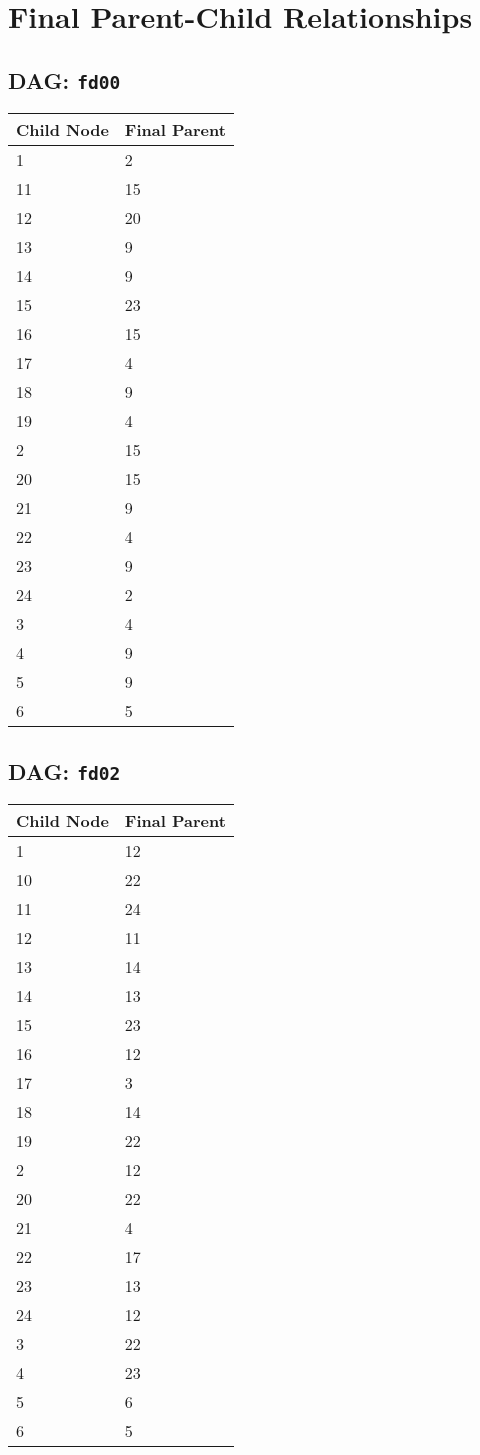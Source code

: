 \documentclass{article}
\begin{document}
\pagestyle{fancy}
\fancyhf{}
\section*{Final Parent-Child Relationships}
\subsection*{DAG: \texttt{fd00}}
\begin{tabular}{ll}
\toprule
\textbf{Child Node} & \textbf{Final Parent} \\
\midrule
1 & 2 \\
11 & 15 \\
12 & 20 \\
13 & 9 \\
14 & 9 \\
15 & 23 \\
16 & 15 \\
17 & 4 \\
18 & 9 \\
19 & 4 \\
2 & 15 \\
20 & 15 \\
21 & 9 \\
22 & 4 \\
23 & 9 \\
24 & 2 \\
3 & 4 \\
4 & 9 \\
5 & 9 \\
6 & 5 \\
\bottomrule
\end{tabular}

\subsection*{DAG: \texttt{fd02}}
\begin{tabular}{ll}
\toprule
\textbf{Child Node} & \textbf{Final Parent} \\
\midrule
1 & 12 \\
10 & 22 \\
11 & 24 \\
12 & 11 \\
13 & 14 \\
14 & 13 \\
15 & 23 \\
16 & 12 \\
17 & 3 \\
18 & 14 \\
19 & 22 \\
2 & 12 \\
20 & 22 \\
21 & 4 \\
22 & 17 \\
23 & 13 \\
24 & 12 \\
3 & 22 \\
4 & 23 \\
5 & 6 \\
6 & 5 \\
\bottomrule
\end{tabular}
\end{document}
